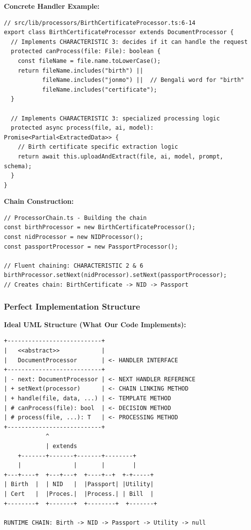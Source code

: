 \documentclass[11pt]{article}
\begin{document}
\textbf{Concrete Handler Example:}
\begin{verbatim}
// src/lib/processors/BirthCertificateProcessor.ts:6-14
export class BirthCertificateProcessor extends DocumentProcessor {
  // Implements CHARACTERISTIC 3: decides if it can handle the request
  protected canProcess(file: File): boolean {
    const fileName = file.name.toLowerCase();
    return fileName.includes("birth") ||
           fileName.includes("jonmo") ||  // Bengali word for "birth"
           fileName.includes("certificate");
  }

  // Implements CHARACTERISTIC 3: specialized processing logic
  protected async process(file, ai, model): Promise<Partial<ExtractedData>> {
    // Birth certificate specific extraction logic
    return await this.uploadAndExtract(file, ai, model, prompt, schema);
  }
}
\end{verbatim}

\textbf{Chain Construction:}
\begin{verbatim}
// ProcessorChain.ts - Building the chain
const birthProcessor = new BirthCertificateProcessor();
const nidProcessor = new NIDProcessor();
const passportProcessor = new PassportProcessor();

// Fluent chaining: CHARACTERISTIC 2 & 6
birthProcessor.setNext(nidProcessor).setNext(passportProcessor);
// Creates chain: BirthCertificate -> NID -> Passport
\end{verbatim}

\subsubsection{Perfect Implementation Structure}

\textbf{Ideal UML Structure (What Our Code Implements):}

\begin{verbatim}
+---------------------------+
|   <<abstract>>            |
|   DocumentProcessor       | <- HANDLER INTERFACE
+---------------------------+
| - next: DocumentProcessor | <- NEXT HANDLER REFERENCE
| + setNext(processor)      | <- CHAIN LINKING METHOD
| + handle(file, data, ...) | <- TEMPLATE METHOD
| # canProcess(file): bool  | <- DECISION METHOD
| # process(file, ...): T   | <- PROCESSING METHOD
+---------------------------+
            ^
            | extends
    +-------+-------+-------+--------+
    |               |       |        |
+---+----+  +---+---+  +----+--+  +-+-----+
| Birth  |  | NID   |  |Passport| |Utility|
| Cert   |  |Proces.|  |Process.| | Bill  |
+--------+  +-------+  +--------+  +-------+

RUNTIME CHAIN: Birth -> NID -> Passport -> Utility -> null
\end{verbatim}
\end{document}
